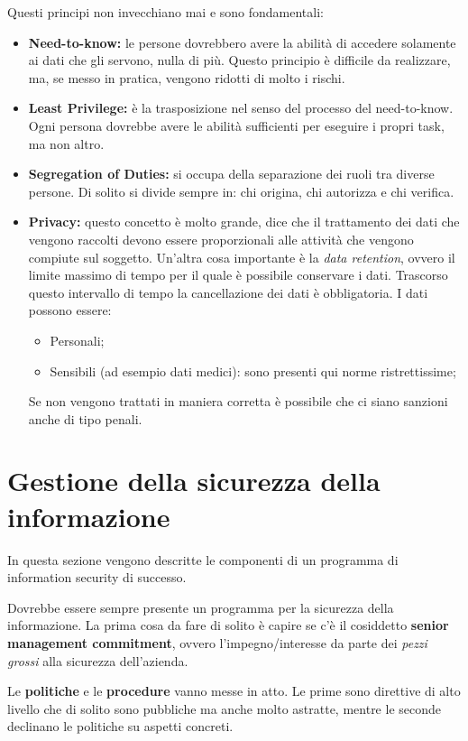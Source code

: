 Questi principi non invecchiano mai e sono fondamentali:
\begin{itemize}
  \item \textbf{Need-to-know:} le persone dovrebbero avere la abilità di
  accedere solamente ai dati che gli servono, nulla di più. Questo principio è
  difficile da realizzare, ma, se messo in pratica, vengono ridotti di molto i
  rischi.
  \item \textbf{Least Privilege:} è la trasposizione nel senso del processo
  del need-to-know. Ogni persona dovrebbe avere le abilità sufficienti per
  eseguire i propri task, ma non altro.
  \item \textbf{Segregation of Duties:} si occupa della separazione dei ruoli
  tra diverse persone. Di solito si divide sempre in: chi origina, chi
  autorizza e chi verifica.
  \item \textbf{Privacy:} questo concetto è molto grande, dice che il
  trattamento dei dati che vengono raccolti devono essere proporzionali alle
  attività che vengono compiute sul soggetto. Un'altra cosa importante è la
  \textit{data retention}, ovvero il limite massimo di tempo per il quale è
  possibile conservare i dati. Trascorso questo intervallo di tempo la
  cancellazione dei dati è obbligatoria. I dati possono essere:
  \begin{itemize}
    \item Personali;
    \item Sensibili (ad esempio dati medici): sono presenti qui norme
    ristrettissime;
  \end{itemize}
  Se non vengono trattati in maniera corretta è possibile che ci siano sanzioni
  anche di tipo penali.
\end{itemize}

\section{Gestione della sicurezza della informazione}

In questa sezione vengono descritte le componenti di un programma di
information security di successo.

Dovrebbe essere sempre presente un programma per la sicurezza della
informazione. La prima cosa da fare di solito è capire se c'è il cosiddetto
\textbf{senior management commitment}, ovvero l'impegno/interesse da parte dei
\emph{pezzi grossi} alla sicurezza dell'azienda.

Le \textbf{politiche} e le \textbf{procedure} vanno messe in atto.
Le prime sono direttive di alto livello che di solito sono pubbliche ma anche
molto astratte, mentre le seconde declinano le politiche su aspetti concreti.

